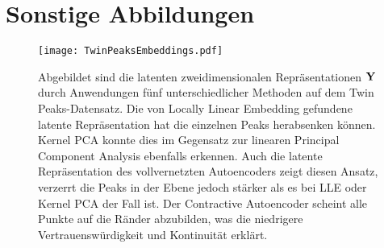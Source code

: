 \section{Sonstige Abbildungen}

\begin{figure}
	\centering
	\texttt{[image: TwinPeaksEmbeddings.pdf]}
	\caption[Latente zweidimensionale Repräsentationen $\mat{Y}$ durch Anwendungen fünf unterschiedlicher Methoden auf dem Twin Peaks-Datensatz.]{Abgebildet sind die latenten zweidimensionalen Repräsentationen $\mat{Y}$ durch Anwendungen fünf unterschiedlicher Methoden auf dem Twin Peaks-Datensatz. Die von Locally Linear Embedding gefundene latente Repräsentation hat die einzelnen Peaks herabsenken können. Kernel PCA konnte dies im Gegensatz zur linearen Principal Component Analysis ebenfalls erkennen. Auch die latente Repräsentation des vollvernetzten Autoencoders zeigt diesen Ansatz, verzerrt die Peaks in der Ebene jedoch stärker als es bei LLE oder Kernel PCA der Fall ist. Der Contractive Autoencoder scheint alle Punkte auf die Ränder abzubilden, was die niedrigere Vertrauenswürdigkeit und Kontinuität erklärt.}
	\label{fig:TwinPeaksEmbeddings}
\end{figure}